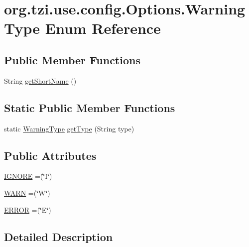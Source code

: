 \hypertarget{enumorg_1_1tzi_1_1use_1_1config_1_1_options_1_1_warning_type}{\section{org.\-tzi.\-use.\-config.\-Options.\-Warning\-Type Enum Reference}
\label{enumorg_1_1tzi_1_1use_1_1config_1_1_options_1_1_warning_type}
}
\subsection*{Public Member Functions}
\begin{DoxyCompactItemize}
\item 
String \hyperlink{enumorg_1_1tzi_1_1use_1_1config_1_1_options_1_1_warning_type_a20b7a6d63f5b4b5752c526172fb4067a}{get\-Short\-Name} ()
\end{DoxyCompactItemize}
\subsection*{Static Public Member Functions}
\begin{DoxyCompactItemize}
\item 
static \hyperlink{enumorg_1_1tzi_1_1use_1_1config_1_1_options_1_1_warning_type}{Warning\-Type} \hyperlink{enumorg_1_1tzi_1_1use_1_1config_1_1_options_1_1_warning_type_ad8c03717e6f8ab395b2cc16baca060f2}{get\-Type} (String type)
\end{DoxyCompactItemize}
\subsection*{Public Attributes}
\begin{DoxyCompactItemize}
\item 
\hyperlink{enumorg_1_1tzi_1_1use_1_1config_1_1_options_1_1_warning_type_ac029cecc7bcdee7bc6d64d42da6ce6e6}{I\-G\-N\-O\-R\-E} =(\char`\"{}I\char`\"{})
\item 
\hyperlink{enumorg_1_1tzi_1_1use_1_1config_1_1_options_1_1_warning_type_a4dadbc79ae4c5d373f84f26a09f7a335}{W\-A\-R\-N} =(\char`\"{}W\char`\"{})
\item 
\hyperlink{enumorg_1_1tzi_1_1use_1_1config_1_1_options_1_1_warning_type_ae40f94103b133dc3d459da742237a7b5}{E\-R\-R\-O\-R} =(\char`\"{}E\char`\"{})
\end{DoxyCompactItemize}


\subsection{Detailed Description}


